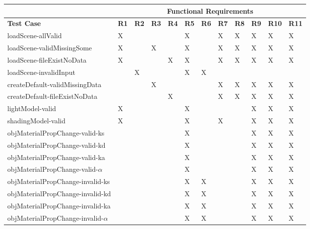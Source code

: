 \documentclass[12pt, titlepage]{article}
\begin{document}
	\begin{tabular}{|p{5cm}|l|l|l|l|l|l|l|l|l|l|l|}
		\hline
		& \multicolumn{11}{c}{Functional Requirements}\\
		\hline
		\textbf{Test Case} & \textbf{R1} & \textbf{R2} & \textbf{R3} & 
		\textbf{R4} & \textbf{R5} & \textbf{R6} & \textbf{R7} & \textbf{R8} & 
		\textbf{R9} & \textbf{R10} & \textbf{R11} \\
		\hline
		loadScene-allValid & X & & & & X &  & X & X & X & X & X \\
		loadScene-validMissingSome & X &  & X &  & X & & X & X & X & X & X\\
		loadScene-fileExistNoData & X &  &  & X & X & & X & X & X	& X & X\\
		loadScene-invalidInput &  & X &  & & X & X & & & & & \\
		createDefault-validMissingData & & & X & & & & X &X& X & X & X\\
		createDefault-fileExistNoData & & & & X & & & X & X &X & X & X\\
		lightModel-valid & X & & & & X & & & & X & X & X\\
		shadingModel-valid & X & & & & X & & X & & X & X &X 
		\\				 				
		objMaterialPropChange-valid-ks & & & & & X & & & & X & X & X\\
		objMaterialPropChange-valid-kd & & & & & X & & & & X & X & X\\
		objMaterialPropChange-valid-ka & & & & & X & & & & X & X & X\\
		objMaterialPropChange-valid-$\alpha$ & & & & & X & & & & X & X & X\\
		objMaterialPropChange-invalid-ks & & & & & X &X & & & X & X & X\\
		objMaterialPropChange-invalid-kd & & & & & X &X & & & X & X & X\\
		objMaterialPropChange-invalid-ka & & & & & X &X & & & X & X & X\\
		objMaterialPropChange-invalid-$\alpha$ & & & & & X &X & & & X & X & X\\
		\hline
	\end{tabular}
~\newline
\end{document}
